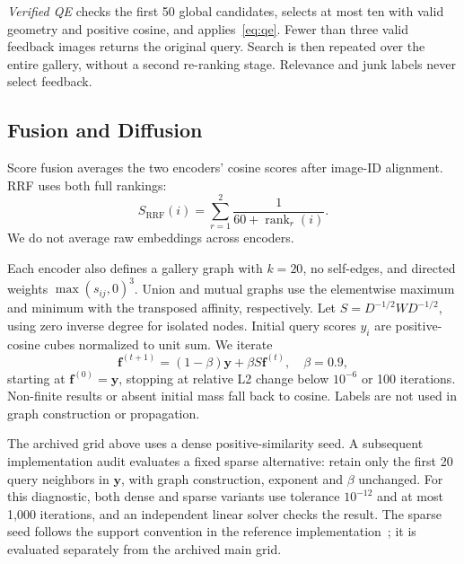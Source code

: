 \emph{Verified QE} checks the first 50 global candidates, selects at most ten with valid geometry and positive cosine, and applies~\eqref{eq:qe}. Fewer than three valid feedback images returns the original query. Search is then repeated over the entire gallery, without a second re-ranking stage. Relevance and junk labels never select feedback.

\subsection{Fusion and Diffusion}
Score fusion averages the two encoders' cosine scores after image-ID alignment. RRF uses both full rankings:
\begin{equation}
 S_{\mathrm{RRF}}(i)=\sum_{r=1}^{2}\frac{1}{60+\operatorname{rank}_r(i)}.
\end{equation}
We do not average raw embeddings across encoders.

Each encoder also defines a gallery graph with $k=20$, no self-edges, and directed weights $\max(s_{ij},0)^3$. Union and mutual graphs use the elementwise maximum and minimum with the transposed affinity, respectively. Let $S=D^{-1/2}WD^{-1/2}$, using zero inverse degree for isolated nodes. Initial query scores $y_i$ are positive-cosine cubes normalized to unit sum. We iterate
\begin{equation}
 \mathbf f^{(t+1)}=(1-\beta)\mathbf y+\beta S\mathbf f^{(t)},
 \quad \beta=0.9,
\end{equation}
starting at $\mathbf f^{(0)}=\mathbf y$, stopping at relative L2 change below $10^{-6}$ or 100 iterations. Non-finite results or absent initial mass fall back to cosine. Labels are not used in graph construction or propagation.

The archived grid above uses a dense positive-similarity seed. A subsequent implementation audit evaluates a fixed sparse alternative: retain only the first 20 query neighbors in $\mathbf y$, with graph construction, exponent and $\beta$ unchanged. For this diagnostic, both dense and sparse variants use tolerance $10^{-12}$ and at most 1,000 iterations, and an independent linear solver checks the result. The sparse seed follows the support convention in the reference implementation~\cite{diffusion}; it is evaluated separately from the archived main grid.
